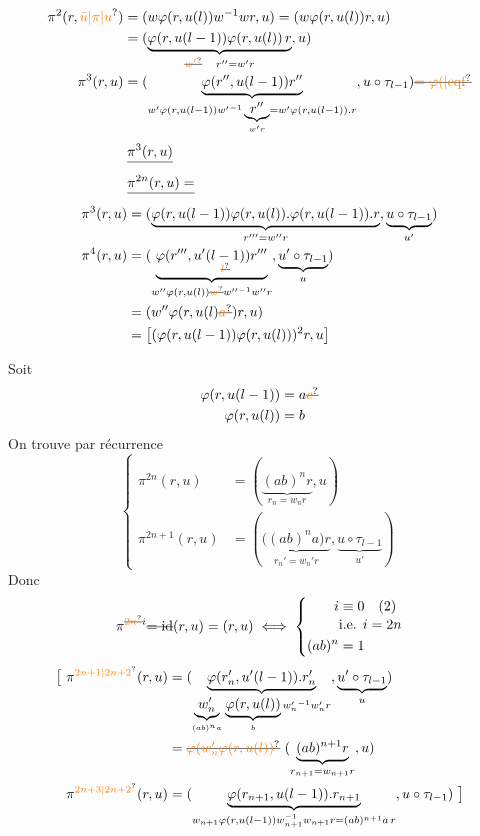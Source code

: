 \[
\begin{aligned}
\pi^2(r,\unsure{\bar u|\pi|u})&=(w\varphi(r,u(l))w^{-1}wr,u)=(w\varphi(r,u(l))r,u)\\
&=(\underbrace{\varphi(r,u(l-1))\varphi(r,u(l))\,r}_{\deleted{\unsure{w'}}\quad r''=w'r},u)\\
\pi^3(r,u)&=(\underbrace{\varphi(r'',u(l-1))r''}_{w'\varphi(r,u(l-1)){w'}^{-1}\underbrace{r''}_{w'r}=w'\varphi(r,u(l-1)).r},u\circ\tau_{l-1})\deleted{\unsure{=\varphi(|\text{cqf}}}
\end{aligned}
\]
\[
\begin{aligned}
&\deleted{\pi^3(r,u)}\\
&\deleted{\pi^{2n}(r,u)=}\\
\pi^3(r,u)&=(\underbrace{\varphi(r,u(l-1))\varphi(r,u(l)).\varphi(r,u(l-1)).r}_{r'''=w''r},\underbrace{u\circ\tau_{l-1}}_{u'})\\
\pi^4(r,u)&=(\underbrace{\varphi(r''',u'(\underset{\deleted{\unsure{l}}}{l-1}))r'''}_{w''\varphi(r,u(l))\deleted{\unsure{w}}{w''}^{-1}w''r},\underbrace{u'\circ\tau_{l-1}}_{u})\\
&=(w''\varphi(r,u(l)\deleted{\unsure{a}})r,u)\\
&=\big[(\varphi(r,u(l-1))\varphi(r,u(l)))^2r,u\big]
\end{aligned}
\]

Soit
\[
\begin{aligned}
\varphi(r,u(l-1))&=a\deleted{\unsure{c}}\\
\varphi(r,u(l))&=b
\end{aligned}
\]
On trouve par récurrence
\[
\left\{\begin{aligned}
\pi^{2n}(r,u)&=(\underbrace{(ab)^nr}_{r_n=w_nr},u)\\
\pi^{2n+1}(r,u)&=(\underbrace{\big((ab)^na\big)r}_{r_n'=w_n'r},\underbrace{u\circ\tau_{l-1}}_{u'})
\end{aligned}\right.
\]
Donc
\[
\pi^{\deleted{\unsure{2n}}i}\deleted{=\mathrm{id}}(r,u)=(r,u)\iff
\left\{\begin{aligned}
i&\equiv0\quad(2)\\[-2pt]
&\text{i.e. }i=2n\\
(ab)^n&=1
\end{aligned}\right.
\]
\[
\begin{aligned}
\big[\ \pi^{\unsure{2n+1|2n+2}}(r,u)&=(\underbrace{\varphi(r'_n,u'(l-1)).r'_n}_{\underbrace{w'_n}_{(ab)^na}\,\underbrace{\varphi(r,u(l))}_{b}{w'_n}^{-1}w'_nr},\underbrace{u'\circ\tau_{l-1}}_{u})\\
&=\deleted{\unsure{\varphi(w'_n\varphi(r,u(l))}}\ (\underbrace{(ab)^{n+1}r}_{r_{n+1}=w_{n+1}r},u)\\
\pi^{\unsure{2n+3|2n+2}}(r,u)&=(\underbrace{\varphi(r_{n+1},u(l-1)).r_{n+1}}_{w_{n+1}\varphi(r,u(l-1))w_{n+1}^{-1}w_{n+1}r=(ab)^{n+1}a\,r},u\circ\tau_{l-1})\ \big]
\end{aligned}
\]

